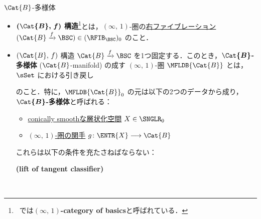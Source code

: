 \documentclass[TQFT_main]{subfiles}
\begin{document}
\begin{mydef}[label=def:B-mfld,breakable]{{$\Cat{B}$}-多様体}
    \begin{itemize}
        \item \textbf{$\bm{(\Cat{B},\, f)}$ 構造}\footnote{~\cite[Definition 1.1.6]{AFT2014stratified}では\textbf{$(\infty,\, 1)$-category of basics}と呼ばれている．}とは，$(\infty,\, 1)$-圏の\hyperref[def:infty-fib]{右ファイブレーション} $(\Cat{B} \xrightarrow{f} \BSC) \in (\RFIB_{\BSC})_0$ のこと．
        \item $(\Cat{B},\, f)$ 構造 $\Cat{B} \xrightarrow{f} \BSC$ を1つ固定する．このとき，\textbf{$\bm{\Cat{B}}$-多様体} ($\Cat{B}$-manifold) の成す $(\infty,\, 1)$-圏 $\MFLDB{\Cat{B}}$ とは，$\sSet$ における引き戻し
        \begin{center}
        \end{center}
        のこと．特に，$\MFLDB{\Cat{B}}_0$ の元は以下の2つのデータから成り，\textbf{$\bm{\Cat{B}}$-多様体}と呼ばれる：
        \begin{itemize}
            \item \hyperref[def:c-smooth]{conically smoothな層状化空間} $X \in \SNGLR_0$
            \item \hyperref[def:infty-1]{$(\infty,\, 1)$-圏の関手} $g \colon \ENTR{X} \lto \Cat{B}$
        \end{itemize}
        これらは以下の条件を充たさねばならない：
        \begin{description}
            \item[\textbf{(lift of tangent classifier)}]　
            

\end{description}
\end{itemize}
\end{mydef}
\end{document}
